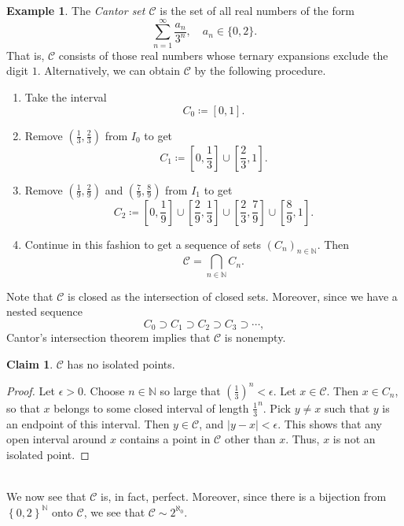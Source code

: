 \documentclass[10pt,letterpaper,cm]{nupset}
\theoremstyle{definition}
\newtheorem{exmp}[definition]{Example}
\theoremstyle{theorem}
\newtheorem*{claim}{Claim}
\theoremstyle{remark}
\newcommand{\N}{\mathbb N}
\newcommand{\1}{\mathbf{1}}
\newcommand{\0}{\vec 0}
\begin{document}
\begin{exmp}
The \textit{Cantor set $\bm{\mathcal{C}}$} is the set of all real numbers of the form $$\sum_{n=1}^{\infty}\frac{a_n}{3^n}, \quad a_n\in \{0,2\}.$$ That is, $\bm{\mathcal{C}}$ consists of those real numbers whose ternary expansions exclude the digit $1$. Alternatively, we can obtain $\bm{\mathcal{C}}$ by the following procedure. 
\begin{enumerate}
\item Take the interval $$C_0 \coloneqq \left[0,1\right].$$
\item Remove $\left(\frac{1}{3}, \frac{2}{3}\right)$ from $I_0$ to get $$C_1\coloneqq \left[0, \frac{1}{3}\right] \cup \left[\frac{2}{3}, 1\right].$$
\item Remove $\left(\frac{1}{9}, \frac{2}{9}\right)$  and $\left(\frac{7}{9}, \frac{8}{9}\right)$ from $I_1$ to get $$C_2 \coloneqq \left[0, \frac{1}{9}\right] \cup \left[\frac{2}{9}, \frac{1}{3}\right] \cup \left[\frac{2}{3}, \frac{7}{9}\right] \cup \left[\frac{8}{9}, 1\right]      .$$
\item Continue in this fashion to get a sequence of sets $\left(C_n\right)_{n\in \N}$. Then $$\bm{\mathcal{C}} = \bigcap_{n\in\N} C_n.$$
\end{enumerate}$ $Note that $\bm{\mathcal{C}}$ is closed as the intersection of closed sets. Moreover, since we have a nested sequence $$C_0 \supset C_1 \supset C_2 \supset C_3 \supset \cdots, $$ Cantor's intersection theorem implies that $\bm{\mathcal{C}} $ is nonempty.
\begin{claim}
$\bm{\mathcal{C}}$ has no isolated points. 
\end{claim}
\begin{proof}
Let $\epsilon >0$. Choose $n\in \N$ so large that $\left(\frac{1}{3}\right)^n <\epsilon$. Let $x\in \bm{\mathcal{C}}$. Then $x\in C_n$, so that $x$ belongs to some closed interval of length $\frac{1}{3}^n$. Pick $y \ne x$ such that $y$ is an endpoint of this interval. Then $y\in \bm{\mathcal{C}}$, and $\left\lvert{y-x}\right\rvert < \epsilon$. This shows that any open interval around $x$ contains a point in $\bm{\mathcal{C}}$ other than $x$. Thus, $x$ is not an isolated point.
\end{proof}$ $
\\We now see that $\bm{\mathcal{C}}$ is, in fact, perfect. Moreover, since there is a bijection from $\left\{0,2\right\}^{\N}$ onto $\bm{\mathcal{C}}$, we see that $\bm{\mathcal{C}} \sim 2^{\aleph_0}$. 
\end{exmp}
\end{document}
